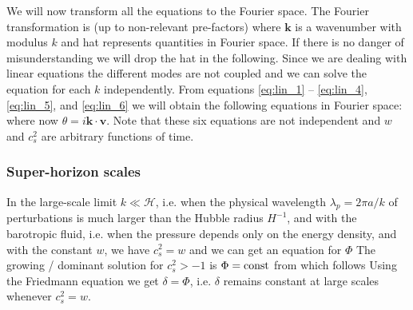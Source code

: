 We will now transform all the equations to the Fourier space. The Fourier transformation is (up to non-relevant pre-factors)
where $\bm k$ is a wavenumber with modulus $k$ and hat represents quantities in Fourier space. If there is no danger of misunderstanding we will drop the hat in the following. Since we are dealing with linear equations the different modes are not coupled and we can solve the equation for each $k$ independently.
 From equations \eqref{eq:lin_1} -- \eqref{eq:lin_4}, \eqref{eq:lin_5}, and \eqref{eq:lin_6} we will obtain the following equations in Fourier space:
where now $\theta=i\bm{k\cdot  v}$. Note that these six equations are not independent and $w$ and $c_s^2$ are arbitrary functions of time.
\subsubsection{Super-horizon scales}
In the large-scale limit $k\ll\mathcal{H}$, i.e. when the physical wavelength $\lambda_p=2\pi a/k$ of perturbations is much larger than the Hubble radius $H^{-1}$, and with the barotropic fluid, i.e. when the pressure depends only on the energy density, and with the constant $w$, we have $c_s^2=w$ and we can get an equation for $\Phi$
The growing / dominant solution for $c_s^2>-1$ is $\Phi=\rm{const}$ from which follows
Using the Friedmann equation we get $\delta=\Phi$, i.e. $\delta$ remains constant at large scales whenever $c_s^2=w$.
